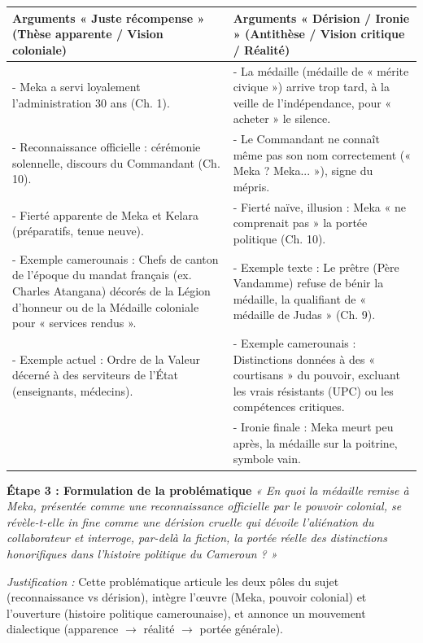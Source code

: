 \documentclass[11pt]{article}
\begin{document}
\begin{exoresolu}
\begin{center}
\begin{tabularx}{\linewidth}{|X|X|}\hline
\rowcolor{popblueL} \textbf{Arguments « Juste récompense » (Thèse apparente / Vision coloniale)} & \textbf{Arguments « Dérision / Ironie » (Antithèse / Vision critique / Réalité)} \\ \hline
- Meka a servi loyalement l'administration 30 ans (Ch. 1). & - La médaille (médaille de « mérite civique ») arrive trop tard, à la veille de l'indépendance, pour « acheter » le silence. \\
- Reconnaissance officielle : cérémonie solennelle, discours du Commandant (Ch. 10). & - Le Commandant ne connaît même pas son nom correctement (« Meka ? Meka... »), signe du mépris. \\
- Fierté apparente de Meka et Kelara (préparatifs, tenue neuve). & - Fierté naïve, illusion : Meka « ne comprenait pas » la portée politique (Ch. 10). \\
- Exemple camerounais : Chefs de canton de l'époque du mandat français (ex. Charles Atangana) décorés de la Légion d'honneur ou de la Médaille coloniale pour « services rendus ». & - Exemple texte : Le prêtre (Père Vandamme) refuse de bénir la médaille, la qualifiant de « médaille de Judas » (Ch. 9). \\
- Exemple actuel : Ordre de la Valeur décerné à des serviteurs de l'État (enseignants, médecins). & - Exemple camerounais : Distinctions données à des « courtisans » du pouvoir, excluant les vrais résistants (UPC) ou les compétences critiques. \\
& - Ironie finale : Meka meurt peu après, la médaille sur la poitrine, symbole vain. \\ \hline
\end{tabularx}
\end{center}

\textbf{Étape 3 : Formulation de la problématique}
\emph{« En quoi la médaille remise à Meka, présentée comme une reconnaissance officielle par le pouvoir colonial, se révèle-t-elle in fine comme une dérision cruelle qui dévoile l'aliénation du collaborateur et interroge, par-delà la fiction, la portée réelle des distinctions honorifiques dans l'histoire politique du Cameroun ? »}

\textit{Justification :} Cette problématique articule les deux pôles du sujet (reconnaissance vs dérision), intègre l'œuvre (Meka, pouvoir colonial) et l'ouverture (histoire politique camerounaise), et annonce un mouvement dialectique (apparence $\to$ réalité $\to$ portée générale).


\end{exoresolu}
\end{document}
